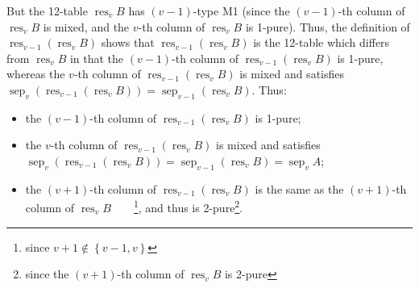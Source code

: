 \documentclass[numbers=enddot,12pt,final,onecolumn,notitlepage]{scrartcl}%
\theoremstyle{definition}
\begin{document}
But the 12-table $\operatorname*{res}\nolimits_{v}B$ has $\left(  v-1\right)
$-type M1 (since the $\left(  v-1\right)  $-th column of $\operatorname*{res}%
\nolimits_{v}B$ is mixed, and the $v$-th column of $\operatorname*{res}%
\nolimits_{v}B$ is 1-pure). Thus, the definition of $\operatorname*{res}%
\nolimits_{v-1}\left(  \operatorname*{res}\nolimits_{v}B\right)  $ shows that
$\operatorname*{res}\nolimits_{v-1}\left(  \operatorname*{res}\nolimits_{v}%
B\right)  $ is the 12-table which differs from $\operatorname*{res}%
\nolimits_{v}B$ in that the $\left(  v-1\right)  $-th column of
$\operatorname*{res}\nolimits_{v-1}\left(  \operatorname*{res}\nolimits_{v}%
B\right)  $ is 1-pure, whereas the $v$-th column of $\operatorname*{res}%
\nolimits_{v-1}\left(  \operatorname*{res}\nolimits_{v}B\right)  $ is mixed
and satisfies $\operatorname*{sep}\nolimits_{v}\left(  \operatorname*{res}%
\nolimits_{v-1}\left(  \operatorname*{res}\nolimits_{v}B\right)  \right)
=\operatorname*{sep}\nolimits_{v-1}\left(  \operatorname*{res}\nolimits_{v}%
B\right)  $. Thus:

\begin{itemize}
\item the $\left(  v-1\right)  $-th column of $\operatorname*{res}%
\nolimits_{v-1}\left(  \operatorname*{res}\nolimits_{v}B\right)  $ is 1-pure;

\item the $v$-th column of $\operatorname*{res}\nolimits_{v-1}\left(
\operatorname*{res}\nolimits_{v}B\right)  $ is mixed and satisfies
$\operatorname*{sep}\nolimits_{v}\left(  \operatorname*{res}\nolimits_{v-1}%
\left(  \operatorname*{res}\nolimits_{v}B\right)  \right)
=\operatorname*{sep}\nolimits_{v-1}\left(  \operatorname*{res}\nolimits_{v}%
B\right)  =\operatorname*{sep}\nolimits_{v}A$;

\item the $\left(  v+1\right)  $-th column of $\operatorname*{res}%
\nolimits_{v-1}\left(  \operatorname*{res}\nolimits_{v}B\right)  $ is the same
as the $\left(  v+1\right)  $-th column of $\operatorname*{res}\nolimits_{v}%
B$\ \ \ \ \footnote{since $v+1\notin\left\{  v-1,v\right\}  $}, and thus is
2-pure\footnote{since the $\left(  v+1\right)  $-th column of
$\operatorname*{res}\nolimits_{v}B$ is 2-pure}.
\end{itemize}
\end{document}
